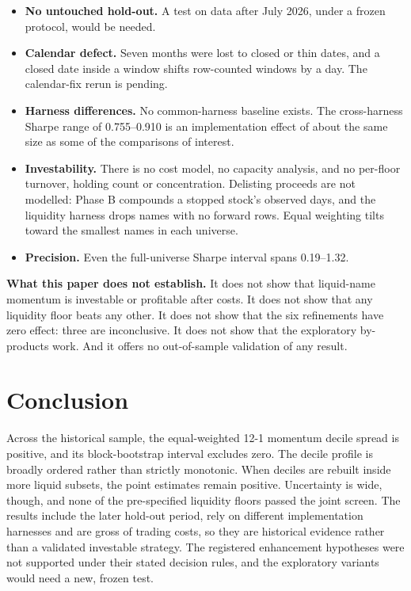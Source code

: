 \documentclass[11pt]{article}
\begin{document}
\begin{itemize}
\item \textbf{No untouched hold-out.} A test on data after July 2026, under a frozen
protocol, would be needed.
\item \textbf{Calendar defect.} Seven months were lost to closed or thin dates, and a
closed date inside a window shifts row-counted windows by a day. The calendar-fix rerun
is pending.
\item \textbf{Harness differences.} No common-harness baseline exists. The cross-harness
Sharpe range of 0.755--0.910 is an implementation effect of about the same size as some
of the comparisons of interest.
\item \textbf{Investability.} There is no cost model, no capacity analysis, and no
per-floor turnover, holding count or concentration. Delisting proceeds are not modelled:
Phase B compounds a stopped stock's observed days, and the liquidity harness drops names
with no forward rows. Equal weighting tilts toward the smallest names in each universe.
\item \textbf{Precision.} Even the full-universe Sharpe interval spans 0.19--1.32.
\end{itemize}

\noindent\textbf{What this paper does not establish.} It does not show that liquid-name
momentum is investable or profitable after costs. It does not show that any liquidity
floor beats any other. It does not show that the six refinements have zero effect: three
are inconclusive. It does not show that the exploratory by-products work. And it offers
no out-of-sample validation of any result.

\section{Conclusion}
Across the historical sample, the equal-weighted 12-1 momentum decile spread is positive,
and its block-bootstrap interval excludes zero. The decile profile is broadly ordered
rather than strictly monotonic. When deciles are rebuilt inside more liquid subsets, the
point estimates remain positive. Uncertainty is wide, though, and none of the
pre-specified liquidity floors passed the joint screen. The results include the later
hold-out period, rely on different implementation harnesses and are gross of trading
costs, so they are historical evidence rather than a validated investable strategy. The
registered enhancement hypotheses were not supported under their stated decision rules,
and the exploratory variants would need a new, frozen test.
\end{document}
